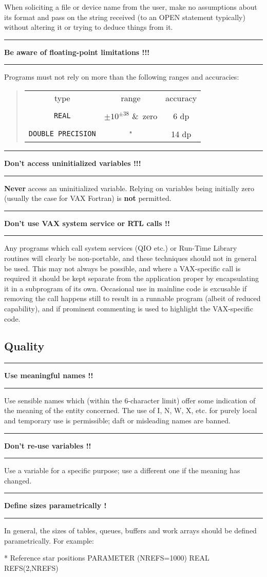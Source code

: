 \documentclass[twoside,11pt,nolof,noabs]{starlink}
\newcounter{sruleno}
\providecommand{\srule}[1]{
    \addtocounter{sruleno}{1}
    \goodbreak
    \rule{\textwidth}{0.3mm}
    \textbf{#1} \scpushright{ \textbf{\thesruleno}}
    \rule{\textwidth}{0.1mm}
}
\renewcommand{\_}{{\tt\char'137}}
\begin{document}
When soliciting a file or device name from the
user, make no assumptions about its format and pass on the
string received (to an OPEN statement typically) without altering
it or trying to deduce things from it.

\srule{Be aware of floating-point limitations !!!}
Programs must not rely on more than the following ranges and accuracies:
\begin{quote}
\begin{tabular}{ccc}
type & range & accuracy \\ \\
\verb|REAL| & $\pm10^{\pm38}$ \&\ zero & 6 dp \\ \\
\verb|DOUBLE PRECISION| & " & 14 dp
\end{tabular}
\end{quote}

\srule{Don't access uninitialized variables !!!}
\textbf{Never} access an uninitialized variable.
Relying on variables being initially zero (usually
the case for VAX Fortran) is \textbf{not} permitted.

\srule{Don't use VAX system service or RTL calls !!}
Any programs which call system services (QIO etc.) or Run-Time Library
routines will clearly be non-portable, and these techniques should
not in general be used.  This may not always be possible, and where
a VAX-specific call is required it should be kept separate from
the application proper by encapsulating it in a subprogram of
its own.  Occasional use in mainline code is excusable if
removing the call happens still to result in a runnable program (albeit
of reduced capability), and if prominent commenting is used to highlight
the VAX-specific code.

\goodbreak
\subsection{Quality}

\srule{Use meaningful names !!}
Use sensible names which (within the 6-character limit) offer some
indication of the meaning of the entity concerned.
The use of I, N, W, X, etc. for purely local and
temporary use is permissible; daft or misleading names are banned.

\srule{Don't re-use variables !!}
Use a variable for a specific purpose; use a different one if the meaning has
changed.

\srule{Define sizes parametrically !}
In general, the sizes of tables, queues, buffers and work arrays should be
defined parametrically.
For example:
\begin{terminalv}
    *  Reference star positions
          PARAMETER (NREFS=1000)
          REAL REFS(2,NREFS)
\end{terminalv}
\end{document}

